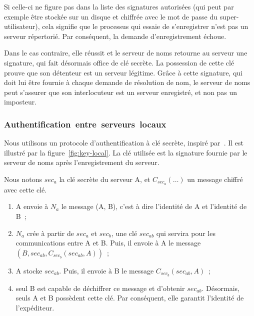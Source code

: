 Si celle-ci ne figure pas dans la liste des signatures autoris\'ees (qui peut par exemple \^etre stock\'ee sur un disque et chiffr\'ee avec le mot de passe du super-utilisateur), cela signifie que le processus qui essaie de s'enregistrer n'est pas un serveur r\'epertori\'e. Par cons\'equent, la demande d'enregistrement \'echoue. 

Dans le cas contraire, elle r\'eussit et le serveur de noms retourne au serveur une signature, qui fait d\'esormais office de cl\'e secr\`ete. La possession de cette cl\'e prouve que son d\'etenteur est un serveur l\'egitime.
Gr\^ace \`a cette signature, qui doit lui \^etre fournie \`a chaque demande de r\'esolution de nom, le serveur de noms peut s'assurer que son interlocuteur est un serveur enregistr\'e, et non pas un imposteur.

\subsubsection{Authentification~entre~serveurs~locaux}

Nous utilisons un protocole d'authentification \`a cl\'e secr\`ete, inspir\'e par~\cite{Needham78}. Il est illustr\'e par la figure~\ref{fig:key-local}. La cl\'e utilis\'ee est la signature fournie par le serveur de noms apr\`es l'enregistrement du serveur.

Nous notons \(sec_{a}\) la cl\'e secr\`ete du serveur A, et \(C_{sec_{a}}(\dots)\) un message chiffr\'e avec cette cl\'e.


\begin{enumerate}
\item  A envoie \`a \(N_{a}\) le message (A, B), c'est \`a dire l'identit\'e de A et l'identit\'e de B~;
\item \(N_{a}\) cr\'ee \`a partir de \(sec_{a}\) et \(sec_{b}\), une cl\'e \(sec_{ab}\) qui servira pour les communications entre A et B. Puis, il envoie \`a A le message \((B, sec_{ab}, C_{sec_{b}}(sec_{ab}, A))\)~;
\item A  stocke \(sec_{ab}\). Puis, il envoie \`a B le message \(C_{sec_{b}}(sec_{ab}, A)\)~;
\item seul B est capable de d\'echiffrer ce message et d'obtenir \(sec_{ab}\). D\'esormais, seuls A et B poss\`edent cette cl\'e. Par cons\'equent, elle garantit l'identit\'e de l'exp\'editeur. 
\end{enumerate}

